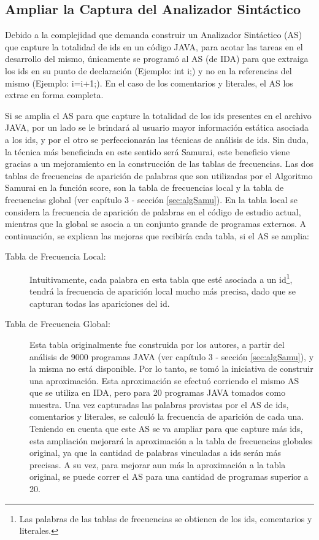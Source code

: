 \subsection{Ampliar la Captura del Analizador Sintáctico}

Debido a la complejidad que demanda construir un Analizador Sintáctico (AS) que capture la totalidad de ids en un código JAVA, para acotar las tareas en el desarrollo del mismo, únicamente se programó al AS (de IDA) para que extraiga los ids en su punto de declaración (Ejemplo: int i;) y no en la referencias del mismo (Ejemplo: i=i+1;). En el caso de los comentarios y literales, el AS los extrae en forma completa. 

Si se amplia el AS para que capture la totalidad de los ids presentes en el archivo JAVA, por un lado se le brindará al usuario mayor información estática asociada a los ids, y por el otro se perfeccionarán las técnicas de análisis de ids. 
Sin duda, la técnica más beneficiada en este sentido será Samurai, este beneficio viene gracias a un mejoramiento en la construcción de las tablas de frecuencias.
Las dos tablas de frecuencias de aparición de palabras que son utilizadas por el Algoritmo Samurai en la función score, son la tabla de frecuencias local y la tabla de frecuencias global (ver capítulo 3 - sección \ref{sec:algSamu}). 
En la tabla local se considera la frecuencia de aparición de palabras en el código de estudio actual, mientras que la global se asocia a un conjunto grande de programas externos. A continuación, se explican las mejoras que recibiría cada tabla, si el AS se amplia:
\pagebreak
\begin{description}
\item[Tabla de Frecuencia Local:] Intuitivamente, cada palabra en esta tabla que esté asociada a un id\footnote[1]{Las palabras de las tablas de frecuencias se obtienen de los ids, comentarios y literales.}, tendrá la frecuencia de aparición local mucho más precisa, dado que se capturan todas las apariciones del id.

\item[Tabla de Frecuencia Global:] Esta tabla originalmente fue construida por los autores, a partir del análisis de 9000 programas JAVA (ver capítulo 3 - sección \ref{sec:algSamu}), y la misma no está disponible. Por lo tanto, se tomó la iniciativa de construir una aproximación. Esta aproximación se efectuó corriendo el mismo AS que se utiliza en IDA, pero para 20 programas JAVA tomados como muestra. Una vez capturadas las palabras provistas por el AS de ids, comentarios y literales, se calculó la frecuencia de aparición de cada una.
Teniendo en cuenta que este AS se va ampliar para que capture más ids, esta ampliación mejorará la aproximación a la tabla de frecuencias globales original, ya que la cantidad de palabras vinculadas a ids serán más precisas. A su vez, para mejorar aun más la aproximación a la tabla original, se puede correr el AS para una cantidad de programas superior a 20.

\end{description}

